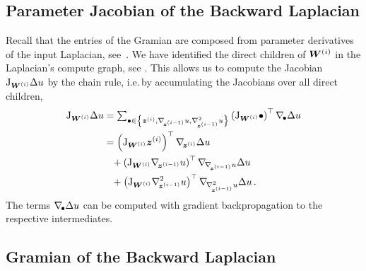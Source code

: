 \subsection{Parameter Jacobian of the Backward Laplacian}\label{subsec:parameter-jacobian-laplacian}
Recall that the entries of the Gramian are composed from parameter derivatives of the input Laplacian, see~.
We have identified the direct children of ${\bm{W}}^{(i)}$ in the Laplacian's compute graph, see .
This allows us to compute the Jacobian $\mathrm{J}_{{\bm{W}}^{(i)}} \Delta u$ by the chain rule, i.e.\,by accumulating the Jacobians over all direct children,
\begin{align}\label{eq:laplacian-gradient}
  \begin{split}
    \jac_{\mW^{(i)}} \Delta u
    &=
      \textstyle
      \sum_{\bullet \in \left\{ \vz^{(i)}, \grad{\vz^{(i-1)}}u, \gradsquared{\vz^{(i-1)}}u \right\}}
      \left(
      \jac_{\mW^{(i)}}\bullet
      \right)^{\top}
      \grad{\bullet}\Delta u
    \\
    &=
      \left(
      \jac_{\mW^{(i)}}\vz^{(i)}
      \right)^{\top}
      \grad{\vz^{(i)}}\Delta u
    \\
    &\phantom{=}+
      \left(
      \jac_{\mW^{(i)}}\grad{\vz^{(i-1)}}u
      \right)^{\top}
      \grad{\grad{\vz^{(i-1)}}u}\Delta u
    \\
    &\phantom{=}+
      \left(
      \jac_{\mW^{(i)}}\gradsquared{\vz^{(i-1)}}u
      \right)^{\top}
      \grad{\gradsquared{\vz^{(i-1)}}u}\Delta u\,.
  \end{split}
\end{align}
The terms $\nabla_{\!{\bullet}}\Delta u$ can be computed with gradient backpropagation to the respective intermediates.

\subsection{Gramian of the Backward Laplacian}\label{subsec-gramian-backward-laplacian}

